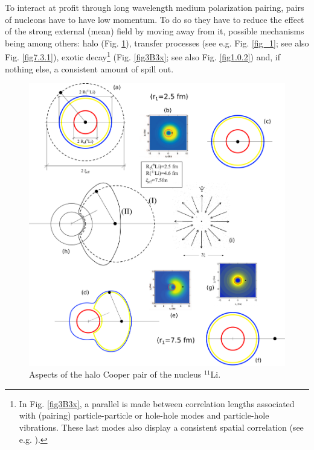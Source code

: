 To interact at profit through long wavelength medium polarization pairing, pairs of nucleons have to have low momentum. To do so they have to reduce the effect of the strong external (mean) field by moving away from it, possible mechanisms being among others: halo (Fig. \ref{fig3B1}), transfer processes (see e.g. Fig. \ref{fig_1}; see also Fig. \ref{fig7.3.1}), exotic decay\footnote{In Fig. \ref{fig3B3x}, a parallel is made between correlation lengths associated with (pairing) particle-particle or hole-hole modes and particle-hole vibrations. These last modes  also display a consistent spatial correlation (see e.g. \cite{Broglia:71}).} (Fig. \ref{fig3B3x}; see also Fig. \ref{fig1.0.2}) and, if nothing else, a consistent amount of spill out.
  \begin{figure}
  	\centerline{\includegraphics*[width=16cm,angle=0]{nutshell/figs/Fig3B1}}
  	\caption{Aspects of the halo Cooper pair of the nucleus $^{11}$Li.}\label{fig3B1}
  \end{figure}

